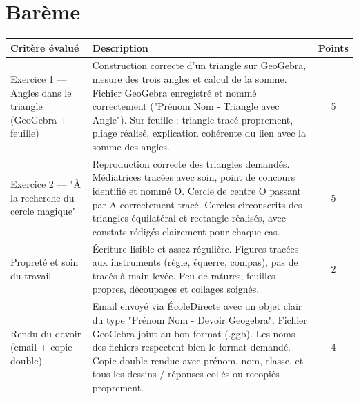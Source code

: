 \documentclass[answers]{exam}
\begin{document}
\vspace{2em}

\section*{Barème}
\renewcommand{\arraystretch}{1.7}

{
  \setlength{\LTright}{0pt}    %

\centering
\begin{longtable}{|L{0.3\textwidth}|L{0.7\textwidth}|c|}
\hline
{}
\textbf{Critère évalué} & \textbf{Description} & \textbf{Points} \\[2pt]
\hline

  Exercice 1 — Angles dans le triangle (GeoGebra + feuille)
  & Construction correcte d'un triangle sur GeoGebra, mesure des trois angles et calcul de la somme.  
  Fichier GeoGebra enregistré et nommé correctement ("Prénom Nom - Triangle avec Angle").  
  Sur feuille : triangle tracé proprement, pliage réalisé, explication cohérente du lien avec la somme des angles.
  & 5 \\
\hline

  Exercice 2 — "À la recherche du cercle magique"
  & Reproduction correcte des triangles demandés.  
  Médiatrices tracées avec soin, point de concours identifié et nommé O.  
  Cercle de centre O passant par A correctement tracé.  
  Cercles circonscrits des triangles équilatéral et rectangle réalisés, avec constats rédigés clairement pour chaque cas.
  & 5 \\
\hline

  Propreté et soin du travail
  & Écriture lisible et assez régulière.  
  Figures tracées aux instruments (règle, équerre, compas), pas de tracés à main levée.  
  Peu de ratures, feuilles propres, découpages et collages soignés.
  & 2 \\
\hline

  Rendu du devoir (email + copie double)
  & Email envoyé via ÉcoleDirecte avec un objet clair du type "Prénom Nom - Devoir Geogebra".  
  Fichier GeoGebra joint au bon format (.ggb). Les noms des fichiers respectent bien le format demandé. 
  Copie double rendue avec prénom, nom, classe, et tous les dessins / réponses collés ou recopiés proprement.
  & 4 \\
\hline


\end{longtable}}
\end{document}
